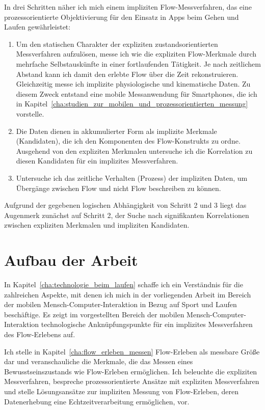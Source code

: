 In drei Schritten näher ich mich einem impliziten Flow-Messverfahren, das eine prozessorientierte Objektivierung für den Einsatz in Apps beim Gehen und Laufen gewährleistet: 
\begin{enumerate}
	\item Um den statischen Charakter der expliziten zustandsorientierten Messverfahren aufzulösen, messe ich wie \citet{Reinhardt2006, Schuler2009} die expliziten Flow-Merkmale durch mehrfache Selbstauskünfte in einer fortlaufenden Tätigkeit. Je nach zeitlichem Abstand kann ich damit den erlebte Flow über die Zeit rekonstruieren. Gleichzeitig messe ich implizite physiologische und kinematische Daten. Zu diesem Zweck entstand eine mobile Messanwendung für Smartphones, die ich in Kapitel~\ref{cha:studien_zur_mobilen_und_prozessorientierten_messung} vorstelle.
	
	\item Die Daten dienen in akkumulierter Form als implizite Merkmale (Kandidaten), die ich den Komponenten des Flow-Konstrukts zu ordne. Ausgehend von den expliziten Merkmalen untersuche ich die Korrelation zu diesen Kandidaten für ein implizites Messverfahren.
	
	\item Untersuche ich das zeitliche Verhalten (Prozess) der impliziten Daten, um Übergänge zwischen Flow und nicht Flow beschreiben zu können. 
\end{enumerate}

Aufgrund der gegebenen logischen Abhängigkeit von Schritt 2 und 3 liegt das Augenmerk zunächst auf Schritt 2, der Suche nach signifikanten Korrelationen zwischen expliziten Merkmalen und impliziten Kandidaten. 

\section{Aufbau der Arbeit} 

\label{sec:aufbau_der_arbeit}

In Kapitel~\ref{cha:technologie_beim_laufen} schaffe ich ein Verständnis für die zahlreichen Aspekte, mit denen ich mich in der vorliegenden Arbeit im Bereich der mobilen Mensch-Computer-Interaktion in Bezug auf Sport und Laufen beschäftige. Es zeigt im vorgestellten Bereich der mobilen Mensch-Computer-Interaktion technologische Anknüpfungspunkte für ein implizites Messverfahren des Flow-Erlebens auf.

Ich stelle in Kapitel~\ref{cha:flow_erleben_messen} Flow-Erleben als messbare Größe dar und veranschauliche die Merkmale, die das Messen eines Bewusstseinszustands wie Flow-Erleben ermöglichen. Ich beleuchte die expliziten Messverfahren, bespreche prozessorientierte Ansätze mit expliziten Messverfahren und stelle Lösungsansätze zur impliziten Messung von Flow-Erleben, deren Datenerhebung eine Echtzeitverarbeitung ermöglichen, vor.

